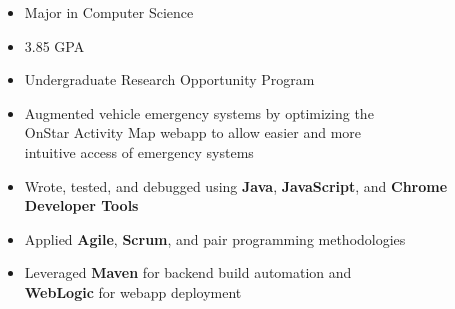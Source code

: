 \documentclass[10pt,a4paper,ragged2e]{altacv}
\begin{document}
\tagline{}

\begin{fullwidth}
\makecvheader
\end{fullwidth}



\begin{itemize}
    \item Major in Computer Science
    \smallskip
    \item 3.85 GPA
    \smallskip
    \item Undergraduate Research Opportunity Program
\end{itemize}



\begin{itemize}
\item Augmented vehicle emergency systems by optimizing the \\OnStar Activity Map webapp to allow easier and more \\intuitive access of emergency systems
\smallskip
\item Wrote, tested, and debugged using \textbf{Java}, \textbf{JavaScript}, and \textbf{Chrome Developer Tools}
\smallskip
\item Applied \textbf{Agile}, \textbf{Scrum}, and pair programming methodologies
\smallskip
\item Leveraged \textbf{Maven} for backend build automation and \\\textbf{WebLogic} for webapp deployment
\end{itemize}
\end{document}

